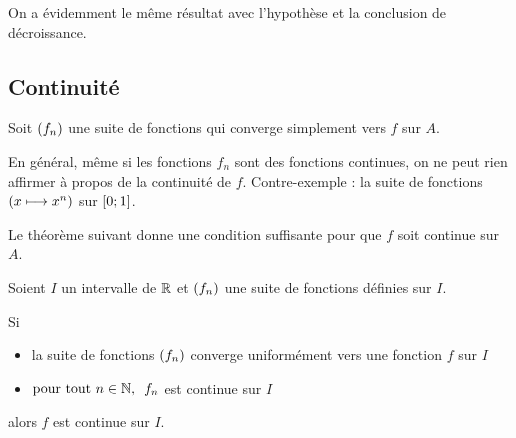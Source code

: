 On a évidemment le même résultat avec l'hypothèse et la conclusion de décroissance.

\subsection{Continuité}

Soit \(\left(f_n\right)\) une suite de fonctions qui converge simplement vers \(f\) sur \(A\).

En général, même si les fonctions \(f_n\) sont des fonctions continues, on ne peut rien affirmer à propos de la continuité de \(f\). Contre-exemple : la suite de fonctions \(\left(x\longmapsto x^n\right)\) sur \(\left[0;1\right]\).

Le théorème suivant donne une condition suffisante pour que \(f\) soit continue sur \(A\).

\begin{theo}
Soient \(I\) un intervalle de \(\mathbb{R}\) et \(\left(f_n\right)\) une suite de fonctions définies sur \(I\).

Si

\begin{itemize}
    \item la suite de fonctions \(\left(f_n\right)\) converge uniformément vers une fonction \(f\) sur \(I\) \\
    \item \(\quantifs{\tpt n\in\N}f_n\) est continue sur \(I\)
\end{itemize}

alors \(f\) est continue sur \(I\).
\end{theo}


